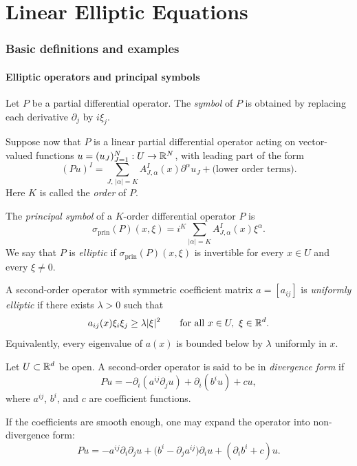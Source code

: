 \part{Linear Elliptic Equations}

\section{Basic definitions and examples}
\subsection{Elliptic operators and principal symbols}

\begin{definition}
Let $P$ be a partial differential operator. The \emph{symbol} of $P$ is obtained by replacing each derivative $\partial_j$ by $i\xi_j$.

Suppose now that $P$ is a linear partial differential operator acting on vector-valued functions $u=(u_J)_{J=1}^N:U\to\mathbb{R}^N$, with leading part of the form
\[
(Pu)^I = \sum_{J,\,|\alpha|=K} A_{J,\alpha}^I(x)\partial^\alpha u_J + \text{(lower order terms)}.
\]
Here $K$ is called the \emph{order} of $P$.
\end{definition}

\begin{definition}
The \emph{principal symbol} of a $K$-order differential operator $P$ is
\[
\sigma_{\mathrm{prin}}(P)(x,\xi)
= i^K\sum_{|\alpha|=K} A^I_{J,\alpha}(x)\xi^\alpha.
\]
We say that $P$ is \emph{elliptic} if $\sigma_{\mathrm{prin}}(P)(x,\xi)$ is invertible for every $x\in U$ and every $\xi\neq 0$.
\end{definition}

\begin{definition}
A second-order operator with symmetric coefficient matrix $a=[a_{ij}]$ is \emph{uniformly elliptic} if there exists $\lambda>0$ such that
\[
a_{ij}(x)\xi_i\xi_j \geq \lambda |
\xi|^2
\qquad \text{for all }x\in U,\ \xi\in\mathbb{R}^d.
\]
Equivalently, every eigenvalue of $a(x)$ is bounded below by $\lambda$ uniformly in $x$.
\end{definition}

\begin{definition}
Let $U\subset\mathbb{R}^d$ be open. A second-order operator is said to be in \emph{divergence form} if
\[
Pu = -\partial_i(a^{ij}\partial_j u) + \partial_i(b^i u) + cu,
\]
where $a^{ij}$, $b^i$, and $c$ are coefficient functions.

If the coefficients are smooth enough, one may expand the operator into non-divergence form:
\[
Pu = -a^{ij}\partial_i\partial_j u + \bigl(b^i-\partial_j a^{ij}\bigr)\partial_i u + (\partial_i b^i + c)u.
\]

\end{definition}

